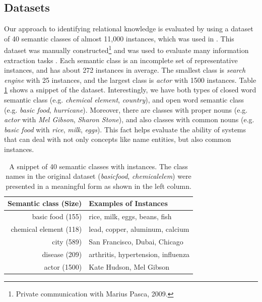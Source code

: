 \subsection{Datasets}
\label{sec:dataset}

Our approach to identifying relational knowledge is evaluated by using a
dataset of 40 semantic classes of almost 11,000 instances, which was
used in \cite{citeulike:1587018}.  This dataset was manually
constructed\footnote{Private communication with Marius Pasca, 2009.}
and was used to evaluate many information extraction tasks
\cite{citeulike:1587018,pacsca-vandurme:2008:ACLMain}.  Each semantic
class is an incomplete set of representative instances, and has about
272 instances in average. The smallest class is {\em search engine}
with 25 instances, and the largest class is {\em actor} with 1500
instances. Table \ref{table:class-instance} shows a snippet of the
dataset. Interestingly, we have both types of closed word semantic
class (e.g. {\em chemical element}, {\em country}), and open word
semantic class (e.g. {\em basic food}, {\em hurricane}). Moreover,
there are classes with proper nouns (e.g. {\em actor} with {\em Mel
  Gibson}, {\em Sharon Stone}), and also classes with common nouns
(e.g. {\em basic food} with {\em rice}, {\em milk}, {\em eggs}). This
fact helps evaluate the ability of systems that can deal with not only
concepts like name entities, but also common instances.

\begin{table}[h]
\small
  \centering
  \begin{tabular}{|r|l|}
    \hline
    \textbf{Semantic class (Size)} & \textbf{Examples of Instances} \\
    \hline
    \hline
    basic food (155) & rice, milk, eggs, beans, fish \\
    \hline
    chemical element (118) & lead, copper, aluminum, calcium \\
    \hline
    city (589) & San Francisco, Dubai, Chicago \\
    \hline
    disease (209) & arthritis, hypertension, influenza \\
    \hline
    actor (1500) & Kate Hudson, Mel Gibson \\
    \hline
  \end{tabular}
  \caption{A snippet of 40 semantic classes with instances. 
    The class names in the original dataset ({\em basicfood}, 
    {\em chemicalelem}) were presented in a meaningful form
    as shown in the left column.}
  \label{table:class-instance}
\end{table}

